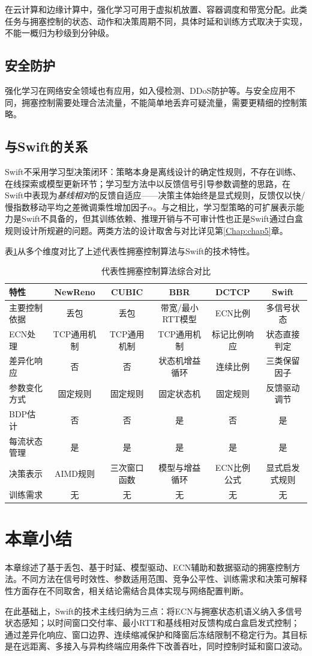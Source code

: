 在云计算和边缘计算中，强化学习可用于虚拟机放置、容器调度和带宽分配。此类任务与拥塞控制的状态、动作和决策周期不同，具体时延和训练方式取决于实现，不能一概归为秒级到分钟级。

\subsection{安全防护}

强化学习在网络安全领域也有应用，如入侵检测、DDoS防护等。与安全应用不同，拥塞控制需要处理合法流量，不能简单地丢弃可疑流量，需要更精细的控制策略。

\subsection{与Swift的关系}

Swift不采用学习型决策闭环：策略本身是离线设计的确定性规则，不存在训练、在线探索或模型更新环节；学习型方法中以反馈信号引导参数调整的思路，在Swift中表现为\emph{基线相对}的反馈自适应——决策主体始终是显式规则，反馈仅以快/慢指数移动平均之差微调乘性增加因子$\alpha$。与之相比，学习型策略的可扩展表示能力是Swift不具备的，但其训练依赖、推理开销与不可审计性也正是Swift通过白盒规则设计所规避的问题。两类方法的设计取舍与对比详见第\ref{Chap:chap5}章。

表\ref{tab:cc_comparison_summary}从多个维度对比了上述代表性拥塞控制算法与Swift的技术特性。

\begin{table}[htbp]
\centering
\caption{代表性拥塞控制算法综合对比}
\label{tab:cc_comparison_summary}
\begin{tabular}{|l|c|c|c|c|c|}
\hline
\textbf{特性} & \textbf{NewReno} & \textbf{CUBIC} & \textbf{BBR} & \textbf{DCTCP} & \textbf{Swift} \\
\hline
主要控制依据 & 丢包 & 丢包 & 带宽/最小RTT模型 & ECN比例 & 多信号状态 \\
ECN处理 & TCP通用机制 & TCP通用机制 & TCP通用机制 & 标记比例响应 & 状态直接判定 \\
差异化响应 & 否 & 否 & 状态机增益循环 & 连续比例 & 三类保留因子 \\
参数变化方式 & 固定规则 & 固定规则 & 固定状态机 & 固定规则 & 反馈驱动调节 \\
BDP估计 & 否 & 否 & 是 & 否 & 是 \\
每流状态管理 & 是 & 是 & 是 & 是 & 是 \\
决策表示 & AIMD规则 & 三次窗口函数 & 模型与增益循环 & ECN比例公式 & 显式启发式规则 \\
训练需求 & 无 & 无 & 无 & 无 & 无 \\
\hline
\end{tabular}
\end{table}

\section{本章小结}

本章综述了基于丢包、基于时延、模型驱动、ECN辅助和数据驱动的拥塞控制方法。不同方法在信号时效性、参数适用范围、竞争公平性、训练需求和决策可解释性方面存在不同取舍，相关结论需结合具体实现与网络配置判断。

在此基础上，Swift的技术主线归纳为三点：将ECN与拥塞状态机语义纳入多信号状态感知；以时间窗口交付率、最小RTT和基线相对反馈构成白盒启发式控制；通过差异化响应、窗口边界、连续缩减保护和降窗后冻结限制不稳定行为。其目标是在远距离、多接入与异构终端应用条件下改善吞吐，同时控制时延和窗口波动。
